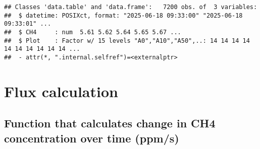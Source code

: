 \documentclass[
]{article}
\newenvironment{Shaded}{\begin{snugshade}}{\end{snugshade}}
\newcommand{\CommentTok}[1]{\textcolor[rgb]{0.56,0.35,0.01}{\textit{#1}}}
\newcommand{\DecValTok}[1]{\textcolor[rgb]{0.00,0.00,0.81}{#1}}
\newcommand{\FunctionTok}[1]{\textcolor[rgb]{0.13,0.29,0.53}{\textbf{#1}}}
\newcommand{\NormalTok}[1]{#1}
\newcommand{\OtherTok}[1]{\textcolor[rgb]{0.56,0.35,0.01}{#1}}
\newcommand{\SpecialCharTok}[1]{\textcolor[rgb]{0.81,0.36,0.00}{\textbf{#1}}}
\begin{document}
\begin{Shaded}
\end{Shaded}

\begin{verbatim}
## Classes 'data.table' and 'data.frame':   7200 obs. of  3 variables:
##  $ datetime: POSIXct, format: "2025-06-18 09:33:00" "2025-06-18 09:33:01" ...
##  $ CH4     : num  5.61 5.62 5.64 5.65 5.67 ...
##  $ Plot    : Factor w/ 15 levels "A0","A10","A50",..: 14 14 14 14 14 14 14 14 14 14 ...
##  - attr(*, ".internal.selfref")=<externalptr>
\end{verbatim}

\section{Flux calculation}\label{flux-calculation}

\subsection{Function that calculates change in CH4 concentration over
time
(ppm/s)}\label{function-that-calculates-change-in-ch4-concentration-over-time-ppms}
\end{document}
